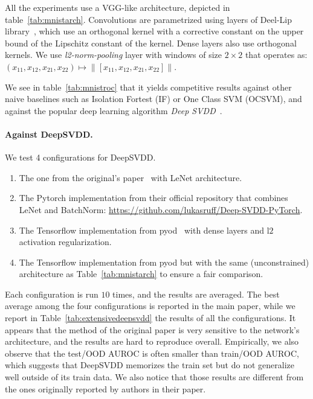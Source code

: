 All the experiments use a VGG-like architecture, depicted in table~\ref{tab:mnistarch}. Convolutions are parametrized using layers of Deel-Lip library~\cite{serrurier2021achieving}, which use an orthogonal kernel with a corrective constant on the upper bound of the Lipschitz constant of the kernel. Dense layers also use orthogonal kernels. We use \textit{l2-norm-pooling} layer with windows of size $2\times 2$ that operates as: $(x_{11},x_{12},x_{21},x_{22})\mapsto \|[x_{11},x_{12},x_{21},x_{22}]\|$.  
  
We see in table~\ref{tab:mnistroc} that it yields competitive results against other naive baselines such as Isolation Fortest (IF) or One Class SVM (OCSVM), and against the popular deep learning algorithm \textit{Deep SVDD}~\cite{ruff2018deep}.  

\paragraph{Against DeepSVDD.} We test 4 configurations for DeepSVDD.
\begin{enumerate}
    \item The one from the original's paper~\cite{ruff2018deep} with LeNet architecture.
    \item The Pytorch implementation from their official repository that combines LeNet and BatchNorm: \url{https://github.com/lukasruff/Deep-SVDD-PyTorch}.
    \item The Tensorflow implementation from pyod~\cite{zhao2019pyod} with dense layers and l$2$ activation regularization.
    \item The Tensorflow implementation from pyod but with the same (unconstrained) architecture as Table~\ref{tab:mnistarch} to ensure a fair comparison.
\end{enumerate}
Each configuration is run $10$ times, and the results are averaged. The best average among the four configurations is reported in the main paper, while we report in Table~\ref{tab:extensivedeepsvdd} the results of all the configurations. It appears that the method of the original paper is very sensitive to the network's architecture, and the results are hard to reproduce overall. Empirically, we also observe that the test/OOD AUROC is often smaller than train/OOD AUROC, which suggests that DeepSVDD memorizes the train set but do not generalize well outside of its train data. We also notice that those results are different from the ones originally reported by authors in their paper.   
  
